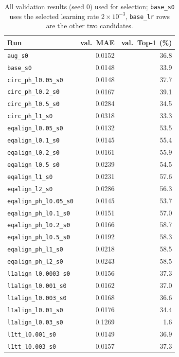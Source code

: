 \begin{table}[h]
\centering
\caption{All validation results (seed 0) used for selection; \texttt{base\_s0} uses the selected learning rate $2\times10^{\ensuremath{-}3}$, \texttt{base\_lr} rows are the other two candidates.}
\label{tab:app_val}
\small
\begin{tabular}{lrr}
\toprule
Run & val.\ MAE & val.\ Top-1 (\%) \\
\midrule
\texttt{aug\_s0} & 0.0152 & 36.8 \\
\texttt{base\_s0} & 0.0148 & 33.9 \\
\texttt{circ\_ph\_l0.05\_s0} & 0.0148 & 37.7 \\
\texttt{circ\_ph\_l0.2\_s0} & 0.0167 & 39.1 \\
\texttt{circ\_ph\_l0.5\_s0} & 0.0284 & 34.5 \\
\texttt{circ\_ph\_l1\_s0} & 0.0318 & 33.3 \\
\texttt{eqalign\_l0.05\_s0} & 0.0132 & 53.5 \\
\texttt{eqalign\_l0.1\_s0} & 0.0145 & 55.4 \\
\texttt{eqalign\_l0.2\_s0} & 0.0161 & 55.9 \\
\texttt{eqalign\_l0.5\_s0} & 0.0239 & 54.5 \\
\texttt{eqalign\_l1\_s0} & 0.0231 & 57.6 \\
\texttt{eqalign\_l2\_s0} & 0.0286 & 56.3 \\
\texttt{eqalign\_ph\_l0.05\_s0} & 0.0145 & 53.7 \\
\texttt{eqalign\_ph\_l0.1\_s0} & 0.0151 & 57.0 \\
\texttt{eqalign\_ph\_l0.2\_s0} & 0.0166 & 58.7 \\
\texttt{eqalign\_ph\_l0.5\_s0} & 0.0192 & 58.3 \\
\texttt{eqalign\_ph\_l1\_s0} & 0.0218 & 58.5 \\
\texttt{eqalign\_ph\_l2\_s0} & 0.0243 & 58.5 \\
\texttt{l1align\_l0.0003\_s0} & 0.0156 & 37.3 \\
\texttt{l1align\_l0.001\_s0} & 0.0162 & 37.0 \\
\texttt{l1align\_l0.003\_s0} & 0.0168 & 36.6 \\
\texttt{l1align\_l0.01\_s0} & 0.0176 & 34.4 \\
\texttt{l1align\_l0.03\_s0} & 0.1269 & 1.6 \\
\texttt{l1tt\_l0.001\_s0} & 0.0149 & 36.9 \\
\texttt{l1tt\_l0.003\_s0} & 0.0157 & 37.3 \\

\end{tabular}
\end{table}
